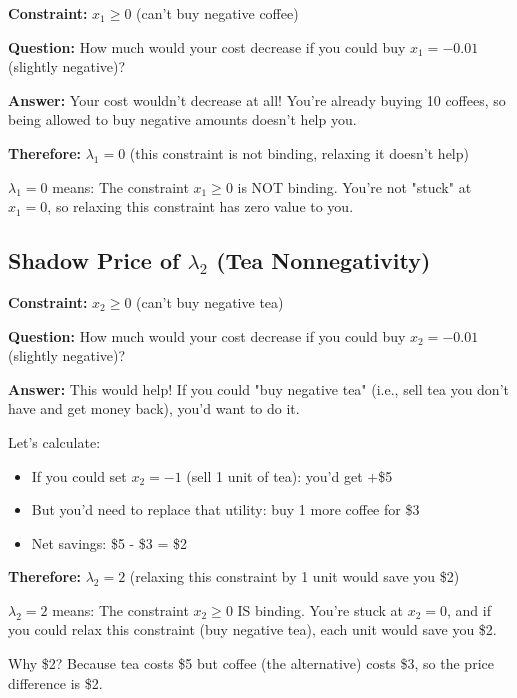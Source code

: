 \documentclass[11pt]{article}
\begin{document}
\textbf{Constraint:} $x_1 \geq 0$ (can't buy negative coffee)

\textbf{Question:} How much would your cost decrease if you could buy $x_1 = -0.01$ (slightly negative)?

\textbf{Answer:} Your cost wouldn't decrease at all! You're already buying 10 coffees, so being allowed to buy negative amounts doesn't help you.

\textbf{Therefore:} $\lambda_1 = 0$ (this constraint is not binding, relaxing it doesn't help)

\begin{tcolorbox}[colback=green!5!white,colframe=green!75!black,title=Interpretation]
$\lambda_1 = 0$ means: The constraint $x_1 \geq 0$ is NOT binding. You're not "stuck" at $x_1 = 0$, so relaxing this constraint has zero value to you.
\end{tcolorbox}

\subsection{Shadow Price of $\lambda_2$ (Tea Nonnegativity)}

\textbf{Constraint:} $x_2 \geq 0$ (can't buy negative tea)

\textbf{Question:} How much would your cost decrease if you could buy $x_2 = -0.01$ (slightly negative)?

\textbf{Answer:} This would help! If you could "buy negative tea" (i.e., sell tea you don't have and get money back), you'd want to do it.

Let's calculate:
\begin{itemize}
\item If you could set $x_2 = -1$ (sell 1 unit of tea): you'd get +\$5
\item But you'd need to replace that utility: buy 1 more coffee for \$3
\item Net savings: \$5 - \$3 = \$2
\end{itemize}

\textbf{Therefore:} $\lambda_2 = 2$ (relaxing this constraint by 1 unit would save you \$2)

\begin{tcolorbox}[colback=green!5!white,colframe=green!75!black,title=Interpretation]
$\lambda_2 = 2$ means: The constraint $x_2 \geq 0$ IS binding. You're stuck at $x_2 = 0$, and if you could relax this constraint (buy negative tea), each unit would save you \$2.

Why \$2? Because tea costs \$5 but coffee (the alternative) costs \$3, so the price difference is \$2.
\end{tcolorbox}
\end{document}
